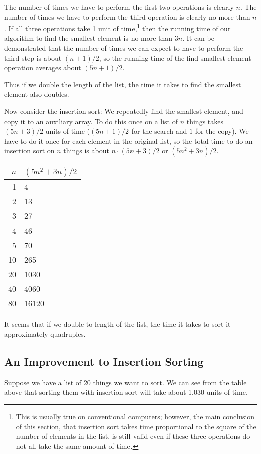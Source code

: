     The number of times we have to perform the first two operations is
clearly $n$.  The number of times we have to perform the third operation
is clearly no more than $n$.  If all three operations take 1 unit of
time,\footnote{This is usually true on conventional computers; however,
the main conclusion of this section, that insertion sort takes time
proportional to the square of the number of elements in the list, is
still valid even if these three operations do not all take the same
amount of time.} then the running time of our algorithm to find the
smallest element is no more than $3n$.  It can be demonstrated that the
number of times we can expect to have to perform the third step is about
$(n+1) / 2$, so the running time of the find-smallest-element operation
averages about $(5n+1) / 2$.

Thus if we double the length of the list, the time it takes to find the
smallest element also doubles.

Now consider the insertion sort: We repeatedly find the smallest
element, and copy it to an auxiliary array.  To do this once on a list
of $n$ things takes $(5n + 3) / 2$ units of time ($(5n+1) / 2$ for the
search and $1$ for the copy).  We have to do it once for each element in
the original list, so the total time to do an insertion sort on $n$
things is about $n\cdot (5n+3)/2$ or $(5n^2 + 3n) / 2$.  

\begin{tabular}{r|l}
$n$ & $(5n^2+3n)/ 2$ \\ \hline
1   & 4 \\
2   & 13 \\
3   & 27 \\
4   & 46 \\
5   & 70 \\
10  & 265 \\
20  & 1030 \\
40  & 4060 \\
80  & 16120 
\end{tabular}

It seems that if we double to length of the list, the time it takes to
sort it approximately quadruples.

\subsection{An Improvement to Insertion Sorting}

Suppose we have a list of 20 things we want to sort.  We can see from
the table above that sorting them with insertion sort will take about
1,030 units of time.

